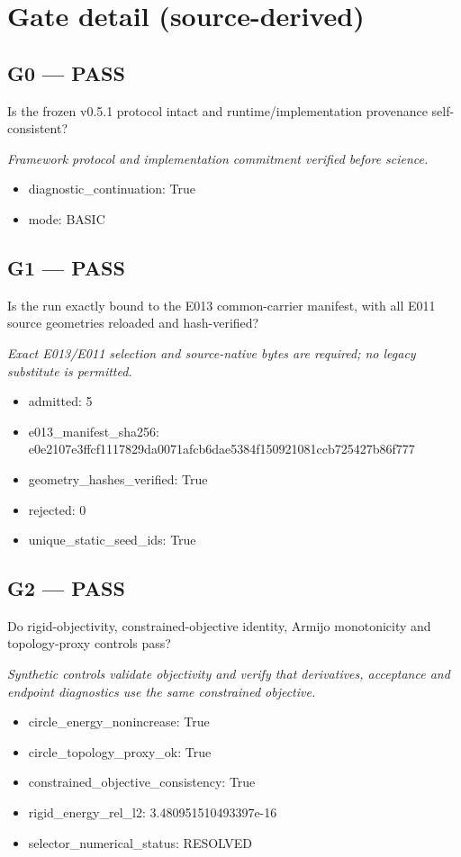 \documentclass[10pt,a4paper]{article}
\begin{document}
\section*{Gate detail (source-derived)}
\subsection*{G0 --- PASS}
Is the frozen v0.5.1 protocol intact and runtime/implementation provenance self-consistent?
\par\textit{Framework protocol and implementation commitment verified before science.}\par
\begin{itemize}
\item diagnostic\_continuation: True
\item mode: BASIC
\end{itemize}
\subsection*{G1 --- PASS}
Is the run exactly bound to the E013 common-carrier manifest, with all E011 source geometries reloaded and hash-verified?
\par\textit{Exact E013/E011 selection and source-native bytes are required; no legacy substitute is permitted.}\par
\begin{itemize}
\item admitted: 5
\item e013\_manifest\_sha256: e0e2107e3ffcf1117829da0071afcb6dae5384f150921081ccb725427b86f777
\item geometry\_hashes\_verified: True
\item rejected: 0
\item unique\_static\_seed\_ids: True
\end{itemize}
\subsection*{G2 --- PASS}
Do rigid-objectivity, constrained-objective identity, Armijo monotonicity and topology-proxy controls pass?
\par\textit{Synthetic controls validate objectivity and verify that derivatives, acceptance and endpoint diagnostics use the same constrained objective.}\par
\begin{itemize}
\item circle\_energy\_nonincrease: True
\item circle\_topology\_proxy\_ok: True
\item constrained\_objective\_consistency: True
\item rigid\_energy\_rel\_l2: 3.480951510493397e-16
\item selector\_numerical\_status: RESOLVED
\end{itemize}
\end{document}
